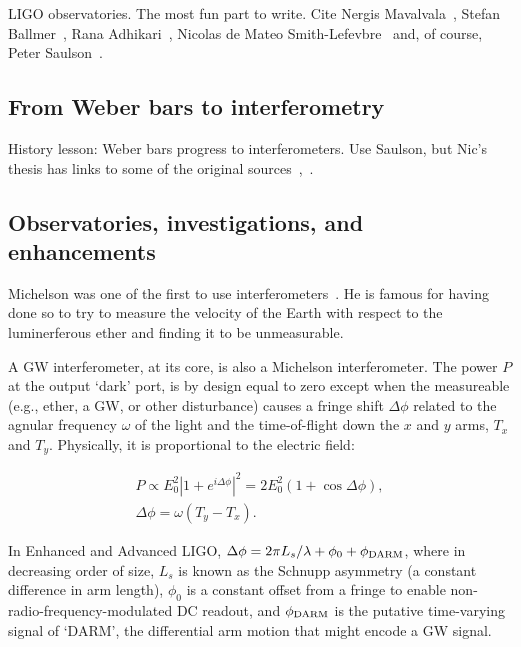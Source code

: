         LIGO observatories. The most fun part to write. Cite Nergis Mavalvala~\cite{MavalvalaThesis}, Stefan Ballmer~\cite{BallmerThesis}, Rana Adhikari~\cite{AdhikariThesis}, Nicolas de Mateo Smith-Lefevbre~\cite{SmithThesis} and, of course, Peter Saulson~\cite{Saulson}.

        \subsection{From Weber bars to interferometry}
        \label{bars_to_interferometry}

            History lesson: Weber bars progress to interferometers. Use Saulson, but Nic's thesis has links to some of the original sources~\cite{Saulson},~\cite{SmithThesis}.           

        \subsection{Observatories, investigations, and enhancements}
        \label{methods}

		Michelson was one of the first to use interferometers~\cite{michelson}. He is famous for having done so to try to measure the velocity of the Earth with respect to the luminerferous ether and finding it to be unmeasurable.

A GW interferometer, at its core, is also a Michelson interferometer. 
The power $P$ at the output `dark' port, is by design equal to zero except when the measureable (e.g., ether, a GW, or other disturbance) causes a fringe shift $\Delta \phi$ related to the agnular frequency $\omega$ of the light and the time-of-flight down the $x$ and $y$ arms, $T_x$ and $T_y$. 
Physically, it is proportional to the electric field: 

\begin{eqnarray}
P \propto E_0^2 \left| 1 + e^{i \Delta \phi}\right|^2 = 2 E_0^2 (1 + \cos \Delta \phi), \\
\Delta \phi = \omega (T_y - T_x).
\end{eqnarray}

In Enhanced and Advanced LIGO, $\Delta \phi = 2\pi L_s /\lambda + \phi_0 + \phi_{\textup{DARM}} $, where in decreasing order of size, $L_s$ is known as the Schnupp asymmetry (a constant difference in arm length), $\phi_0$ is a constant offset from a fringe to enable non-radio-frequency-modulated DC readout, and $\phi_{\textup{DARM}}$ is the putative time-varying signal of `DARM', the differential arm motion that might encode a GW signal. 

